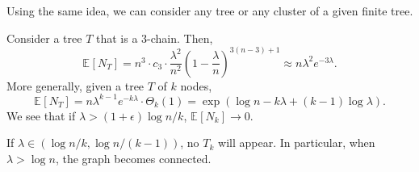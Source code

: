 \begin{eg}
	Using the same idea, we can consider any tree or any cluster of a given finite tree.
\end{eg}

Consider a tree \(T\) that is a \(3\)-chain. Then,
\[
	\mathbb{E}_{}[N_T]
	= n^3 \cdot c_3 \cdot \frac{\lambda ^2}{n^2} \left( 1 - \frac{\lambda}{n} \right) ^{3 (n-3) + 1}
	\approx n \lambda ^2 e^{-3\lambda }.
\]
More generally, given a tree \(T\) of \(k\) nodes,
\[
	\mathbb{E}_{}[N_T]
	= n \lambda ^{k-1} e^{-k \lambda } \cdot \Theta _{k} (1)
	= \exp (\log n - k \lambda + (k-1) \log \lambda ).
\]
We see that if \(\lambda > (1 + \epsilon ) \log n / k\), \(\mathbb{E}_{}[N_k] \to 0\).

If \(\lambda \in (\log n / k, \log n / (k-1))\), no \(T_k\) will appear. In particular, when \(\lambda > \log n\), the graph becomes connected.